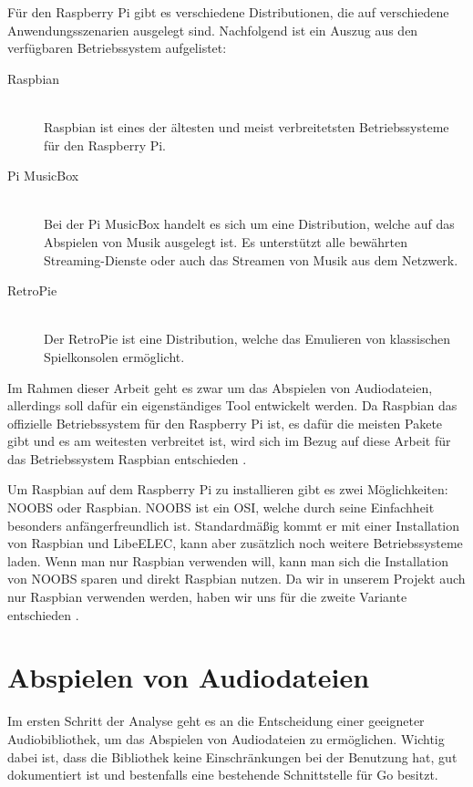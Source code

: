Für den Raspberry Pi gibt es verschiedene Distributionen, die auf verschiedene
Anwendungsszenarien ausgelegt sind. Nachfolgend ist ein Auszug aus den verfügbaren
Betriebssystem aufgelistet: 
\begin{description}
\item[Raspbian] \hfill \\ 
    Raspbian ist eines der ältesten und meist verbreitetsten Betriebssysteme für
    den Raspberry Pi. 
\item[Pi MusicBox] \hfill \\ 
    Bei der Pi MusicBox handelt es sich um eine Distribution, welche auf das
    Abspielen von Musik ausgelegt ist. Es unterstützt alle bewährten
    Streaming-Dienste oder auch das Streamen von Musik aus dem Netzwerk.
\item[RetroPie] \hfill \\
    Der RetroPie ist eine Distribution, welche das Emulieren von klassischen
    Spielkonsolen ermöglicht.
\end{description}

Im Rahmen dieser Arbeit geht es zwar um das Abspielen von Audiodateien,
allerdings soll dafür ein eigenständiges Tool entwickelt werden. Da Raspbian
das offizielle Betriebssystem für den Raspberry Pi ist, es dafür die meisten
Pakete gibt und es am weitesten verbreitet ist, wird sich im Bezug auf diese
Arbeit für das Betriebssystem Raspbian entschieden
\autocite{Best_Raspberry_Pi_distros_2019}.
\hfill \break

Um Raspbian auf dem Raspberry Pi zu installieren gibt es zwei Möglichkeiten:
\ac{NOOBS} oder Raspbian. \ac{NOOBS} ist ein \ac{OSI}, welche durch seine Einfachheit besonders anfängerfreundlich ist.
Standardmäßig kommt er mit einer Installation von Raspbian und LibeELEC, kann
aber zusätzlich noch weitere Betriebssysteme laden. Wenn man nur Raspbian
verwenden will, kann man sich die Installation von \ac{NOOBS} sparen und direkt
Raspbian nutzen. Da wir in unserem Projekt auch nur Raspbian verwenden werden,
haben wir uns für die zweite Variante entschieden \autocite{monk_2019}.


\section{Abspielen von Audiodateien}
Im ersten Schritt der Analyse geht es an die Entscheidung einer geeigneter
Audiobibliothek, um das Abspielen von Audiodateien zu ermöglichen. Wichtig
dabei ist, dass die Bibliothek keine Einschränkungen bei der Benutzung hat, gut
dokumentiert ist und bestenfalls eine bestehende Schnittstelle für Go besitzt.

